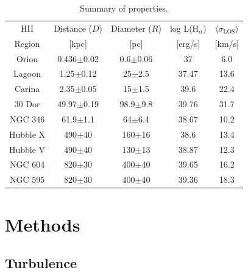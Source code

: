 \documentclass[fleqn,usenatbib, useAMS, a4paper]{mnras}
\begin{document}
\begin{table}
\begin{center}\caption{Summary of properties.}
\begin{tabular}{ccccc}\hline
HII       &  Distance ($D$)          & Diameter ($R$) & log L(H$_{\alpha}$) &  \(\langle \sigma_{\text{LOS}} \rangle \) \\
Region    &  [kpc]          &  [pc]    &  [erg/s]            &    [km/s]  \\ 
\hline
Orion    & 0.436$\pm$0.02  & 0.6$\pm$0.06  &    37               &   6.0      \\
Lagoon    & 1.25$\pm$0.12   & 25$\pm$2.5       &    37.47            &   13.6     \\
Carina    & 2.35$\pm$0.05   & 15$\pm$1.5       &    39.6             &   22.4     \\
30 Dor    & 49.97$\pm$0.19  & 98.9$\pm$9.8     &    39.76            &   31.7     \\
NGC 346   & 61.9$\pm$1.1    & 64$\pm$6.4       &    38.67            &   10.2     \\
Hubble X  & 490$\pm$40      & 160$\pm$16      &    38.6             &   13.4     \\
Hubble V  & 490$\pm$40      & 130$\pm$13 &    38.87            &   12.3     \\
NGC 604   & 820$\pm$30      & 400$\pm$40      &    39.65            &   16.2     \\
NGC 595   & 820$\pm$30      & 400$\pm$40      &    39.36            &   18.3     \\
\hline
\end{tabular}\label{tab:Reg}
\end{center}
\end{table} 



\section{Methods}\label{sec:met}

\subsection{Turbulence}
\end{document}
